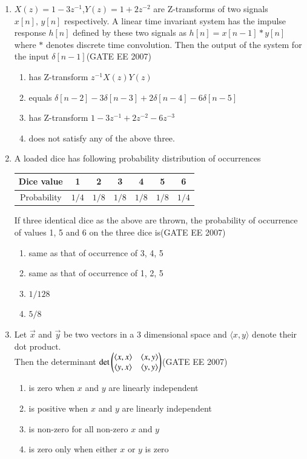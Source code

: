 \documentclass[a4paper,10pt]{exam}
\theoremstyle{remark}
\begin{document}
\begin{enumerate}
\vfill
{}
\newpage


\item  \quad $X(z) = 1 - 3z^{-1}$,\quad $Y(z) = 1 + 2z^{-2}$ are Z-transforms of two signals $x[n],\,y[n]$ respectively.
A linear time invariant system has the impulse response $h[n]$ defined by these two signals as
$
    h[n] = x[n-1] * y[n]
$
where $*$ denotes discrete time convolution. Then the output of the system for the input $\delta[n-1]$\hfill{(GATE EE 2007)} 
\begin{enumerate}
    \item has Z-transform $z^{-1} X(z) Y(z)$
    \item equals $\delta[n-2] - 3\delta[n-3] + 2\delta[n-4] - 6\delta[n-5]$
    \item has Z-transform $1 - 3z^{-1} + 2z^{-2} - 6z^{-3}$
    \item does not satisfy any of the above three.
\end{enumerate}


\item  \quad A loaded dice has following probability distribution of occurrences

\begin{center}
\begin{tabular}{|c|c|c|c|c|c|c|}
\hline
Dice value      & 1   & 2   & 3   & 4   & 5   & 6   \\
\hline
Probability     & $1/4$ & $1/8$ & $1/8$ & $1/8$ & $1/8$ & $1/4$ \\
\hline
\end{tabular}
\end{center}

If three identical dice as the above are thrown, the probability of occurrence of values 1, 5 and 6 on the three dice is\hfill{(GATE EE 2007)} 
 
\begin{enumerate}
    \item same as that of occurrence of 3, 4, 5
    \item same as that of occurrence of 1, 2, 5
    \item$1/128$
    \item $5/8$
\end{enumerate}


\item  \quad Let $\vec{x}$ and $\vec{y}$ be two vectors in a 3 dimensional space and $\langle x, y \rangle$ denote their dot product.\\
Then the determinant
$
\det\begin{pmatrix}
\langle x, x \rangle & \langle x, y \rangle \\
\langle y, x \rangle & \langle y, y \rangle 
\end{pmatrix}
$\hfill{(GATE EE 2007)} 
\noindent
\begin{enumerate}
\item is zero when $x$ and $y$ are linearly independent
\item is positive when $x$ and $y$ are linearly independent
\item is non-zero for all non-zero $x$ and $y$
\item is zero only when either $x$ or $y$ is zero
\end{enumerate}


\end{enumerate}
\end{document}
